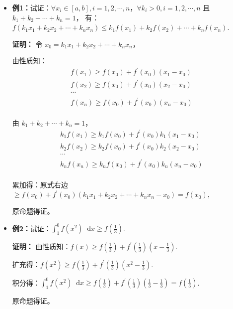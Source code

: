 \documentclass[b5paper]{ctexart}
\renewcommand{\d}{\mathop{}\!\mathrm{d}}
\begin{document}
	\begin{itemize}
		\item \textbf{例1：}试证：$\forall x_i \in [a, b], i = 1,2, \cdots, n$，$\forall k_i > 0, i = 1,2, \cdots, n$ 且 $k_1 + k_2 + \cdots + k_n = 1$，
		有：$f(k_1x_1 + k_2x_2 + \cdots + k_nx_n) \le k_1f(x_1) + k_2f(x_2) + \cdots + k_nf(x_n)$.
		
		\textbf{证明：} 令 $x_0  = k_1x_1 + k_2x_2 + \cdots + k_nx_n$，
		
		由性质知：	 
		\begin{equation}
			\begin{split}
				f(x_1) \ge f(x_0) + f^{'}(x_0) (x_1 - x_0) \\
				f(x_2) \ge f(x_0) + f^{'}(x_0) (x_2 - x_0) \\
				\cdots \\
				f(x_n) \ge f(x_0) + f^{'}(x_0) (x_n - x_0) \\
			\end{split}			
		\end{equation}
		
		由 $k_1 + k_2 + \cdots + k_n = 1$，
		\begin{equation}
			\begin{split}
				k_1f(x_1) \ge k_1f(x_0) + f^{'}(x_0) k_1 (x_1 - x_0) \\
				k_2f(x_2) \ge k_2f(x_0) + f^{'}(x_0) k_2(x_2 - x_0) \\
				\cdots \\
				k_nf(x_n) \ge k_nf(x_0) + f^{'}(x_0) k_n(x_n - x_0) \\
			\end{split}			
		\end{equation}
		
		累加得：原式右边 $\ge f(x_0) + f^{'}(x_0) (k_1x_1 + k_2x_2 + \cdots + k_nx_n - x_0) = f(x_0)$,
		
		原命题得证。
		
		\item \textbf{例2：}试证：$\int_{1}^{0} f(x^2) \d x \ge f(\frac{1}{3})$.
		
		\textbf{证明：} 由性质知：$f(x) \ge f(\frac{1}{3}) + f^{'}(\frac{1}{3})(x - \frac{1}{3})$.
		
		扩充得：$f(x^2) \ge f(\frac{1}{3}) + f^{'}(\frac{1}{3})(x^2 - \frac{1}{3})$.
		
		积分得：$\int_{1}^{0} f(x^2) \d x \ge f(\frac{1}{3}) + f^{'}(\frac{1}{3})(\frac{1}{3} - \frac{1}{3}) = f(\frac{1}{3})$.
		
		原命题得证。
		

\end{itemize}
\end{document}
